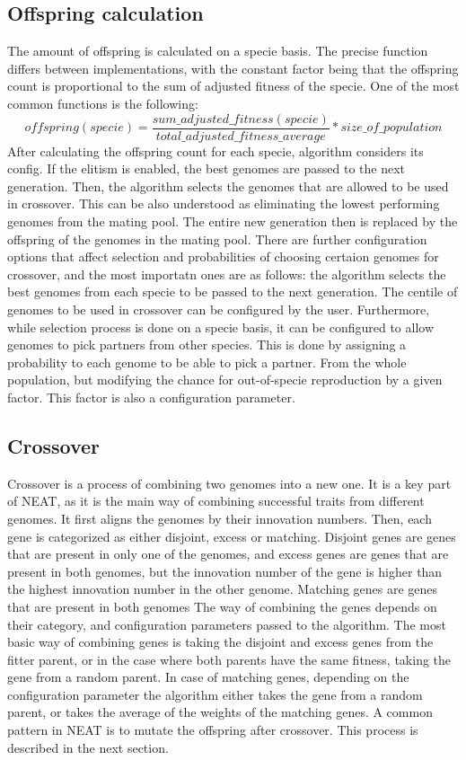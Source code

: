 \documentclass{article}
\begin{document}
\subsection{Offspring calculation}
The amount of offspring is calculated on a specie basis. The precise function differs between implementations, with the constant factor being that
the offspring count is proportional to the sum of adjusted fitness of the specie. One of the most common functions is the following: 
$$offspring(specie) = \frac{sum\_adjusted\_fitness(specie)}{total\_adjusted\_fitness\_average} * size\_of\_population$$
After calculating the offspring count for each specie, algorithm considers its config. If the elitism is enabled, the best genomes are
passed to the next generation. Then, the algorithm selects the genomes that are allowed to be used in crossover. This can be also understood as
eliminating the lowest performing genomes from the mating pool. The entire new generation then is replaced by the offspring of the genomes in the mating pool.
There are further configuration options that affect selection and probabilities of choosing certaion genomes for crossover, and the most importatn
ones are as follows:
the algorithm selects the best genomes from each specie to be passed to the next generation.
The centile of genomes to be used in crossover can be configured by the user. Furthermore, while selection process is done on a specie basis, it can
be configured to allow genomes to pick partners from other species. This is done by assigning a probability to each genome to be able to pick a partner.
From the whole population, but modifying the chance for out-of-specie reproduction by a given factor. This factor is also a configuration parameter.

\subsection{Crossover}
Crossover is a process of combining two genomes into a new one. It is a key part of NEAT, as it is the main way of combining successful traits from different
genomes. It first aligns the genomes by their innovation numbers. Then, each gene is categorized as either disjoint, excess or matching.
Disjoint genes are genes that are present in only one of the genomes, and excess genes are genes that are present in both genomes, but the innovation number of
the gene is higher than the highest innovation number in the other genome. Matching genes are genes that are present in both genomes
The way of combining the genes depends on their category, and configuration parameters passed to the algorithm. The most basic way of combining genes
is taking the disjoint and excess genes from the fitter parent, or in the case where both parents have the same fitness, taking the gene from a random parent.
In case of matching genes, depending on the configuration parameter the algorithm either takes the gene from a random parent, or takes the average of the weights 
of the matching genes.
A common pattern in NEAT is to mutate the offspring after crossover. This process is described in the next section.
\end{document}

